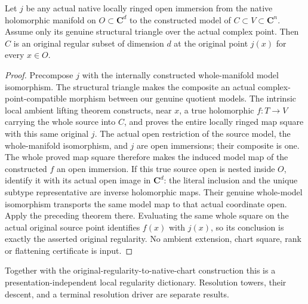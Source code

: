 \begin{theorem}
\label{hir:actual-intrinsic-manifold-chart-original-regularity}
\leanok
Let $j$ be any actual native locally ringed open immersion from the native
holomorphic manifold on $O\subset\mathbf C^d$ to the constructed model of
$C\subset V\subset\mathbf C^n$. Assume only its genuine structural triangle
over the actual complex point. Then $C$ is an original regular subset of
dimension $d$ at the original point $j(x)$ for every $x\in O$.
\end{theorem}
\begin{proof}
Precompose $j$ with the internally constructed whole-manifold model
isomorphism. The structural triangle makes the composite an actual
complex-point-compatible morphism between our genuine quotient models.
The intrinsic local ambient lifting theorem constructs, near $x$, a true
holomorphic $f:T\to V$ carrying the whole source into $C$, and proves the
entire locally ringed map square with this same original $j$. The actual
open restriction of the source model, the whole-manifold isomorphism, and
$j$ are open immersions; their composite is one. The whole proved map
square therefore makes the induced model map of the constructed $f$ an
open immersion. If this true source open is nested inside $O$, identify it with its actual
open image in $\mathbf C^d$: the literal inclusion and the unique subtype
representative are inverse holomorphic maps. Their genuine whole-model
isomorphism transports the same model map to that actual coordinate open.
Apply the preceding theorem there. Evaluating the same whole
square on the actual original source point identifies $f(x)$ with $j(x)$,
so its conclusion is exactly the asserted original regularity. No ambient
extension, chart square, rank or flattening certificate is input.
\end{proof}

Together with the original-regularity-to-native-chart construction this is
a presentation-independent local regularity dictionary. Resolution towers,
their descent, and a terminal resolution driver are separate results.
